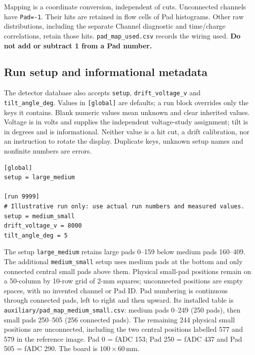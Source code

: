 \documentclass[11pt,a4paper]{article}
\begin{document}
Mapping is a coordinate conversion, independent of cuts. Unconnected channels have
\texttt{Pad=-1}. Their hits are retained in flow cells of Pad histograms. Other
raw distributions, including the separate Channel diagnostic and time/charge
correlations, retain those hits. \texttt{pad\_map\_used.csv} records the wiring used.
\textbf{Do not add or subtract 1 from a Pad number.}

\subsection{Run setup and informational metadata}
The detector database also accepts \texttt{setup}, \texttt{drift\_voltage\_v}
and \texttt{tilt\_angle\_deg}. Values in \texttt{[global]} are defaults;
a run block overrides only the keys it contains. Blank numeric values mean
unknown and clear inherited values. Voltage is in volts and supplies the independent
voltage-study assignment; tilt is in degrees and is informational. Neither value
is a hit cut, a drift calibration, nor an instruction to rotate the display.
Duplicate keys, unknown setup names and nonfinite numbers are errors.
\begin{lstlisting}
[global]
setup = large_medium

[run 9999]
# Illustrative run only: use actual run numbers and measured values.
setup = medium_small
drift_voltage_v = 8000
tilt_angle_deg = 5
\end{lstlisting}
The setup \texttt{large\_medium} retains large pads 0--159 below medium pads
160--409. The additional \texttt{medium\_small} setup uses medium pads at the
bottom and only connected central small pads above them. Physical small-pad
positions remain on a 50-column by 10-row grid of 2-mm squares; unconnected
positions are empty spaces, with no invented channel or Pad ID. Pad numbering
is continuous through connected pads, left to right and then upward.
Its installed table is \texttt{auxiliary/pad\_map\_medium\_small.csv}:
medium pads 0--249 (250 pads), then small pads 250--505 (256 connected pads).
The remaining 244 physical small positions are unconnected, including the two
central positions labelled 577 and 579 in the reference image.
Pad 0 = fADC 153; Pad 250 = fADC 437 and Pad 505 = fADC 290.
The board is $100\times60$\,mm.
\end{document}
